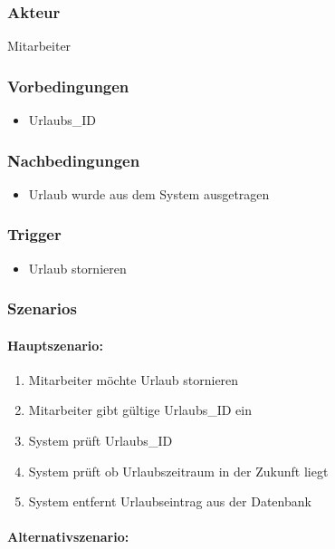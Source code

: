 \subsubsection{Akteur}
Mitarbeiter
\subsubsection{Vorbedingungen}
\begin{itemize}
    \item Urlaubs\_ID
\end{itemize}
\subsubsection{Nachbedingungen}
\begin{itemize}
    \item Urlaub wurde aus dem System ausgetragen
\end{itemize}
\subsubsection{Trigger}
\begin{itemize}
    \item Urlaub stornieren
\end{itemize}

\subsubsection{Szenarios}
\paragraph{Hauptszenario:}

\begin{enumerate}
    \item Mitarbeiter möchte Urlaub stornieren
	\item Mitarbeiter gibt gültige Urlaubs\_ID ein
	\item System prüft Urlaubs\_ID
	\item System prüft ob Urlaubszeitraum in der Zukunft liegt
	\item System entfernt Urlaubseintrag aus der Datenbank
\end{enumerate}

\paragraph{Alternativszenario:}

